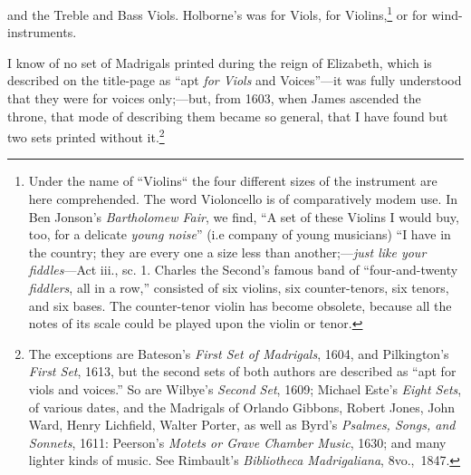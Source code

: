  and the Treble and Bass Viols. Holborne’s was for Viols, for Violins,\footnote{\textit{}
Under the name of “Violins“ the four different sizes
of the instrument are here comprehended. The word
Violoncello is of comparatively modem use. In Ben
Jonson’s \textit{Bartholomew Fair}, we find, “A set of these
Violins I would buy, too, for a delicate \textit{young noise}” (i.e
company of young musicians) “I have in the country;
they are every one a size less than another;—\textit{just like your
fiddles}—Act iii., sc. 1. Charles the Second’s famous
band of “four-and-twenty \textit{fiddlers}, all in a row,” consisted
of six violins, six counter-tenors, six tenors,
and six bases. The counter-tenor violin has become obsolete, 
because all the notes of its scale could be played
upon the violin or tenor.}
or for wind-instruments.

I know of no set of Madrigals printed during the reign of Elizabeth, which is
described on the title-page as “apt \textit{for Viols} and Voices”—it was fully understood
that they were for voices only;—but, from 1603, when James ascended the
throne, that mode of describing them became so general, that I have found but
two sets printed without it.\footnote{
The exceptions are Bateson’s \textit{First Set of Madrigals},
1604, and Pilkington’s \textit{First Set}, 1613, but the second sets
of both authors are described as “apt for viols and voices.”
So are Wilbye’s \textit{Second Set}, 1609; Michael Este’s \textit{Eight Sets},
of various dates, and the Madrigals of Orlando Gibbons,
Robert Jones, John Ward, Henry Lichfield, Walter Porter,
as well as Byrd's \textit{Psalmes, Songs, and Sonnets}, 1611: Peerson’s
\textit{Motets or Grave Chamber Music}, 1630; and many
lighter kinds of music. See Rimbault’s \textit{Bibliotheca
Madrigaliana}, 8vo.,~1847.}

\pagebreak

